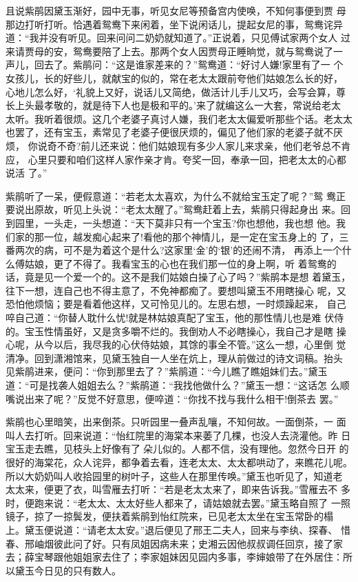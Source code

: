 且说紫鹃因黛玉渐好，园中无事，听见女尼等预备宫内使唤，不知何事便到贾
母那边打听打听。恰遇着鸳鸯下来闲着，坐下说闲话儿，提起女尼的事，鸳鸯诧异
道：“我并没有听见。回来问问二奶奶就知道了。”正说着，只见傅试家两个女人
过来请贾母的安，鸳鸯要陪了上去。那两个女人因贾母正睡晌觉，就与鸳鸯说了一
声儿，回去了。紫鹃问：“这是谁家差来的？”鸳鸯道：“好讨人嫌!家里有了一
个女孩儿，长的好些儿，就献宝的似的，常在老太太跟前夸他们姑娘怎么长的好，
心地儿怎么好，‘礼貌上又好，说话儿又简绝，做活计儿手儿又巧，会写会算，尊
长上头最孝敬的，就是待下人也是极和平的。’来了就编这么一大套，常说给老太
太听。我听着很烦。这几个老婆子真讨人嫌，我们老太太偏爱听那些个话。老太太
也罢了，还有宝玉，素常见了老婆子便很厌烦的，偏见了他们家的老婆子就不厌烦，
你说奇不奇?前儿还来说：他们姑娘现有多少人家儿来求亲，他们老爷总不肯应，
心里只要和咱们这样人家作亲才肯。夸奖一回，奉承一回，把老太太的心都说活
了。”

紫鹃听了一呆，便假意道：“若老太太喜欢，为什么不就给宝玉定了呢？”鸳
鸯正要说出原故，听见上头说：“老太太醒了。”鸳鸯赶着上去，紫鹃只得起身出
来。回到园里，一头走，一头想道：“天下莫非只有一个宝玉?你也想他，我也想
他。我们家的那一位，越发痴心起来了!看他的那个神情儿，是一定在宝玉身上的
了，三番两次的病，可不是为着这个是什么?这家里‘金’的‘银’的还闹不清，
再添上一个什么傅姑娘，更了不得了。我看宝玉的心也在我们那一位的身上啊，听
着鸳鸯的话，竟是见一个爱一个的。这不是我们姑娘白操了心了吗？”紫鹃本是想
着黛玉，往下一想，连自己也不得主意了，不免神都痴了。要想叫黛玉不用瞎操心
呢，又恐怕他烦恼；要是看着他这样，又可怜见儿的。左思右想，一时烦躁起来，
自己啐自己道：“你替人耽什么忧!就是林姑娘真配了宝玉，他的那性情儿也是难
伏侍的。宝玉性情虽好，又是贪多嚼不烂的。我倒劝人不必瞎操心，我自己才是瞎
操心呢，从今以后，我尽我的心伏侍姑娘，其馀的事全不管。”这么一想，心里倒
觉清净。回到潇湘馆来，见黛玉独自一人坐在炕上，理从前做过的诗文词稿。抬头
见紫鹃进来，便问：“你到那里去了？”紫鹃道：“今儿瞧了瞧姐妹们去。”黛玉
道：“可是找袭人姐姐去么？”紫鹃道：“我找他做什么？”黛玉一想：“这话怎
么顺嘴说出来了呢？”反觉不好意思，便啐道：“你找不找与我什么相干!倒茶去
罢。”

紫鹃也心里暗笑，出来倒茶。只听园里一叠声乱嚷，不知何故。一面倒茶，一
面叫人去打听。回来说道：“怡红院里的海棠本来萎了几棵，也没人去浇灌他。昨
日宝玉走去瞧，见枝头上好像有了朵儿似的。人都不信，没有理他。忽然今日开
的很好的海棠花，众人诧异，都争着去看，连老太太、太太都哄动了，来瞧花儿呢。
所以大奶奶叫人收拾园里的树叶子，这些人在那里传唤。”黛玉也听见了，知道老
太太来，便更了衣，叫雪雁去打听：“若是老太太来了，即来告诉我。”雪雁去不
多时，便跑来说：“老太太、太太好些人都来了，请姑娘就去罢。”黛玉略自照了
一照镜子，掠了一掠鬓发，便扶着紫鹃到怡红院来，已见老太太坐在宝玉常卧的榻
上。黛玉便说道：“请老太太安。”退后便见了邢王二夫人，回来与李纨、探春、
惜春、邢岫烟彼此问了好。只有凤姐因病未来；史湘云因他叔叔调任回京，接了家
去；薛宝琴跟他姐姐家去住了；李家姐妹因见园内多事，李婶娘带了在外居住：所
以黛玉今日见的只有数人。

